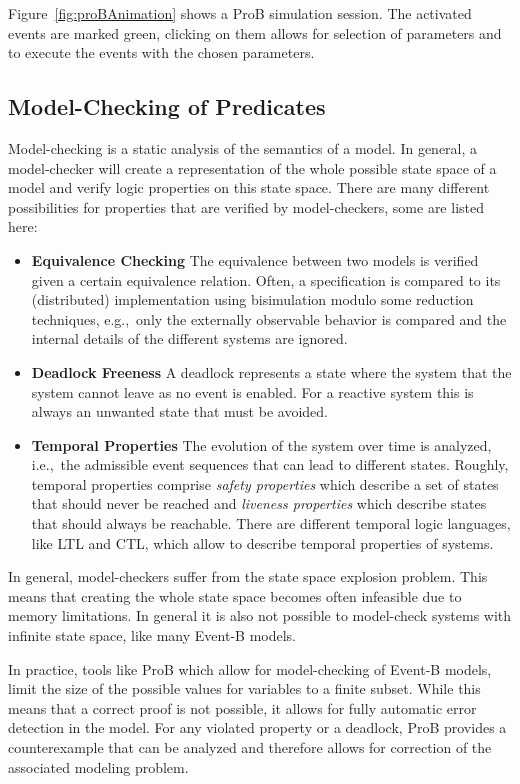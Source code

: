 \documentclass{article}
\begin{document}
Figure~\ref{fig:proBAnimation} shows a ProB simulation session. The activated
events are marked green, clicking on them allows for selection of parameters and
to execute the events with the chosen parameters.


\subsection{Model-Checking of Predicates}
\label{sec:model-check-pred}

Model-checking is a static analysis of the semantics of a model. In general, a
model-checker will create a representation of the whole possible state space of
a model and verify logic properties on this state space. There are many
different possibilities for properties that are verified by model-checkers, some
are listed here:

\begin{itemize}
\item {\bf Equivalence Checking} The equivalence between two models is verified
  given a certain equivalence relation. Often, a specification is compared to
  its (distributed) implementation using bisimulation modulo some reduction
  techniques, e.g.,\ only the externally observable behavior is compared and the
  internal details of the different systems are ignored.
\item {\bf Deadlock Freeness} A deadlock represents a state where the system
  that the system cannot leave as no event is enabled. For a reactive system
  this is always an unwanted state that must be avoided.
\item {\bf Temporal Properties} The evolution of the system over time is
  analyzed, i.e.,\ the admissible event sequences that can lead to different
  states. Roughly, temporal properties comprise \emph{safety properties} which
  describe a set of states that should never be reached and \emph{liveness
    properties} which describe states that should always be reachable. There are
  different temporal logic languages, like LTL and CTL, which allow to describe
  temporal properties of systems.
\end{itemize}

In general, model-checkers suffer from the state space explosion problem. This
means that creating the whole state space becomes often infeasible due to memory
limitations. In general it is also not possible to model-check systems with
infinite state space, like many Event-B models.

In practice, tools like ProB which allow for model-checking of Event-B models,
limit the size of the possible values for variables to a finite subset. While
this means that a correct proof is not possible, it allows for fully automatic
error detection in the model. For any violated property or a deadlock, ProB
provides a counterexample that can be analyzed and therefore allows for
correction of the associated modeling problem.
\end{document}
